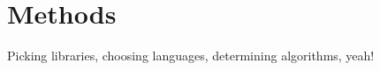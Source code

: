 \chapter{Methods}
\label{chapter:methods}

Picking libraries, choosing languages, determining algorithms, yeah!